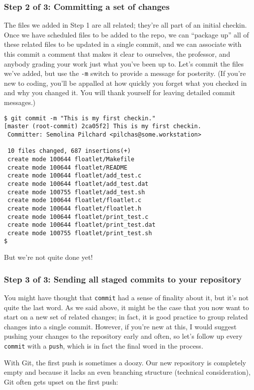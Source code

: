 \documentclass[12pt]{article}
\begin{document}
\subsubsection{Step 2 of 3: Committing a set of changes}
The files we added in Step 1 are all related; they're all part of an initial checkin.   Once we have scheduled files to be added to the repo, we can ``package up'' all of these related files to be updated in a single commit, and we can associate with this commit a comment that makes it clear to ourselves, the professor, and anybody grading your work just what you've been up to.  Let's commit the files we've added, but use the \verb|-m| switch to provide a message for posterity.  (If you're new to coding, you'll be appalled at how quickly you forget what you checked in and why you changed it.  You will thank yourself for leaving detailed commit messages.)

\begin{verbatim}
$ git commit -m "This is my first checkin."
[master (root-commit) 2ca05f2] This is my first checkin.
 Committer: Semolina Pilchard <pilchas@some.workstation>

 10 files changed, 687 insertions(+)
 create mode 100644 floatlet/Makefile
 create mode 100644 floatlet/README
 create mode 100644 floatlet/add_test.c
 create mode 100644 floatlet/add_test.dat
 create mode 100755 floatlet/add_test.sh
 create mode 100644 floatlet/floatlet.c
 create mode 100644 floatlet/floatlet.h
 create mode 100644 floatlet/print_test.c
 create mode 100644 floatlet/print_test.dat
 create mode 100755 floatlet/print_test.sh
$ 
\end{verbatim}

But we're not quite done yet!

\subsubsection{Step 3 of 3: Sending all staged commits to your repository}
You might have thought that \verb|commit| had a sense of finality about it, but it's not quite the last word.  As we said above, it might be the case that you now want to start on a new set of related changes; in fact, it is good practice to group related changes into a single commit.  However, if you're new at this, I would suggest pushing your changes to the repository early and often, so let's follow up every \verb|commit| with a \verb|push|, which is in fact the final word in the process.

With Git, the first push is sometimes a doozy.  Our new repository is completely empty and because it lacks an even  branching structure (technical consideration), Git often gets upset on the first push:
\end{document}
